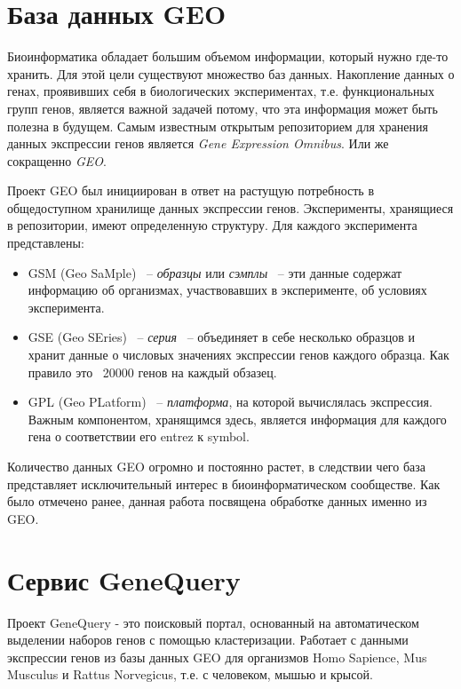 \documentclass[times,specification,annotation]{itmo-student-thesis}
\begin{document}
\section{База данных GEO}

Биоинформатика обладает большим объемом информации, который нужно где-то хранить. Для этой цели существуют множество баз данных. Накопление данных о генах, проявивших себя в биологических экспериментах, т.е. функциональных групп генов, является важной задачей потому, что эта информация может быть полезна в будущем. Самым известным открытым репозиторием для хранения данных экспрессии генов является \textit{Gene Expression Omnibus}. Или же сокращенно \textit{GEO}.

Проект GEO был инициирован в ответ на растущую потребность в общедоступном хранилище данных экспрессии генов.\cite{GEO} Эксперименты, хранящиеся в репозитории, имеют определенную структуру. Для каждого эксперимента представлены: 
\begin{itemize}
    \item GSM (Geo SaMple) ~-- \textit{образцы} или \textit{сэмплы} ~-- эти данные содержат информацию об организмах, участвовавших в эксперименте, об условиях эксперимента.
    \item GSE (Geo SEries) ~-- \textit{серия} ~-- объединяет в себе несколько образцов и хранит данные о числовых значениях экспрессии генов каждого образца. Как правило это ~20000 генов на каждый обзазец.
    \item GPL (Geo PLatform) ~-- \textit{платформа}, на которой вычислялась экспрессия. Важным компонентом, хранящимся здесь, является информация для каждого гена о соответствии его entrez к symbol.     
\end{itemize}

Количество данных GEO огромно и постоянно растет, в следствии чего база представляет исключительный интерес в биоинформатическом сообществе. Как было отмечено ранее, данная работа посвящена обработке данных именно из GEO.   

\section{Сервис GeneQuery}

Проект GeneQuery\cite{GeneQuery} - это поисковый портал, основанный на автоматическом выделении наборов генов с помощью кластеризации. Работает с данными экспрессии генов из базы данных GEO для организмов Homo Sapience, Mus Musculus и Rattus Norvegicus, т.е. с человеком, мышью и крысой. 
\end{document}
